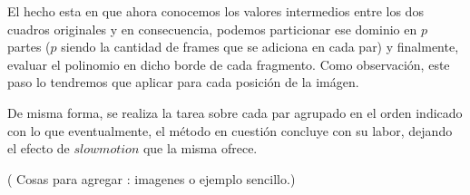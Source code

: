El hecho esta en que ahora conocemos los valores intermedios entre los dos cuadros originales y en consecuencia, podemos particionar ese dominio en $p$ partes ($p$ siendo la cantidad de frames que se adiciona en cada par) y finalmente, evaluar el polinomio en dicho borde de cada fragmento. Como observaci\'on, este paso lo tendremos que aplicar para cada posici\'on de la im\'agen.

De misma forma, se realiza la tarea sobre cada par agrupado en el orden indicado con lo que eventualmente, el m\'etodo en cuesti\'on concluye con su labor, dejando el efecto de $slowmotion$ que la misma ofrece.

( Cosas para agregar : imagenes o ejemplo sencillo.)